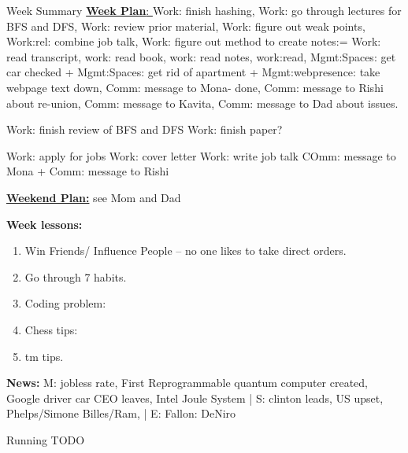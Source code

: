 \documentclass[serif, mathserif, final]{beamer}
\newcommand{\doneTask}[1]{\tiny \item \tiny \sout{#1}}
\newcommand{\te}[1]{\textit{TimeEst:}\textit{#1}}
\newcommand{\dl}[1]{\textit{Deadline:}\textit{#1}}
\begin{document}
\begin{frame}
\begin{columns}
\begin{column}{0.5\linewidth}
\begin{block}{Week Summary}
        {\tiny \underline{\textbf{Week Plan}: } \tiny Work: finish hashing, Work: go
        through lectures for BFS and DFS, Work: review prior material, Work:
        figure out weak points, Work:rel: combine job talk, Work: figure out
        method to create notes:= Work: read transcript, work: read book, work:
        read notes, work:read,  Mgmt:Spaces: get car checked + Mgmt:Spaces:
        get rid of apartment + Mgmt:webpresence: take webpage text down, Comm:
        message to Mona- done, Comm: message to Rishi about re-union, Comm:
        message to Kavita, Comm: message to Dad about issues.} 

Work: finish review of BFS and DFS 
Work: finish paper? 

Work: apply for jobs 
Work: cover letter
Work: write job talk  
COmm: message to Mona + Comm: message to Rishi 


        {\tiny \underline{\textbf{Weekend Plan:}} see Mom and Dad}

        {\tiny {\bf Week lessons:}}
        \begin{enumerate}
          \tiny \item \tiny Win Friends/ Influence People – no one
          likes to take direct orders.
        \item \tiny Go through 7 habits.
        \item \tiny Coding problem: 
        \item \tiny Chess tips: 
        \item \tiny tm tips.
        \end{enumerate} 

        {{\tiny \bf News:} M: jobless rate, First Reprogrammable
          quantum computer created, Google driver car CEO leaves,
          Intel Joule System | S: clinton leads, US upset, Phelps/Simone
          Billes/Ram, | E: Fallon: DeNiro} 

      \begin{block}{Running TODO} %
\end{block}
\end{block}
\end{column}
\end{columns}
\end{frame}
\end{document}
